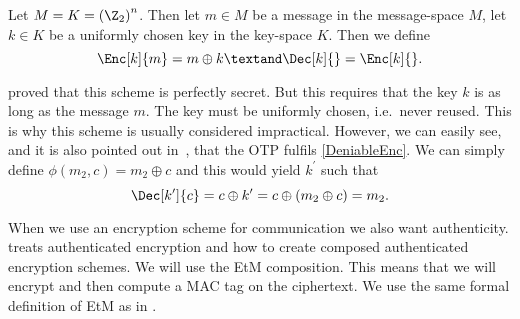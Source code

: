 \begin{definition}\label{OTP}
  Let \(M = K = {(\Z_2)}^n\).
  Then let \(m\in M\) be a message in the message-space \(M\), let \(k\in K\) 
  be a uniformly chosen key in the key-space \(K\).
  Then we define \[
    \Enc[k]{ m } = m\oplus k \textand \Dec[k]{} = \Enc[k]{}.
  \]
\end{definition}

\citet{ShannonSecrecy} proved that this scheme is perfectly secret.
But this requires that the key \(k\) is as long as the message \(m\).
The key must be uniformly chosen, i.e.~never reused.
This is why this scheme is usually considered impractical.
However, we can easily see, and it is also pointed out 
in~\cite{DeniableEncryption}, that the \ac{OTP} fulfils 
\cref{DeniableEnc}.
We can simply define \(\phi( m_2, c ) = m_2\oplus c\) and this would yield 
\(k^\prime\) such that \[
  \Dec[k^\prime]{ c } = c\oplus k^\prime = c\oplus ( m_2\oplus c ) = m_2.
\]

When we use an encryption scheme for communication we also want authenticity.
\citet{AuthEncryption} treats authenticated encryption and how to create 
composed authenticated encryption schemes.
We will use the \ac{EtM} composition.
This means that we will encrypt and then compute a \ac{MAC} tag on the 
ciphertext.
We use the same formal definition of \ac{EtM} as in 
\cite{AuthEncryption}.

